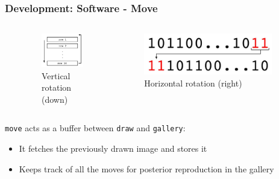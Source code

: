 \documentclass{beamer}
\begin{document}
\begin{frame}
\frametitle{Development: Software - Move}

\begin{columns}

\begin{column}{0.05\textwidth}
\end{column}

\begin{column}{0.45\textwidth}
\begin{figure}
	\includegraphics[scale=0.22]{images/vertical_rotation.jpg}
	\caption{Vertical rotation (down)}
\end{figure}
\end{column}

\begin{column}{0.45\textwidth}
\begin{figure}
	\includegraphics[scale=0.14]{images/horizontal_rotation.jpg}
	\caption{Horizontal rotation (right)}
\end{figure}
\end{column}

\begin{column}{0.05\textwidth}
\end{column}

\end{columns}

{\tt move} acts as a buffer between {\tt draw} and {\tt gallery}:
\begin{itemize}
\item It fetches the previously drawn image and stores it
\item Keeps track of all the moves for posterior reproduction in the gallery
\end{itemize}

\end{frame}
\end{document}
